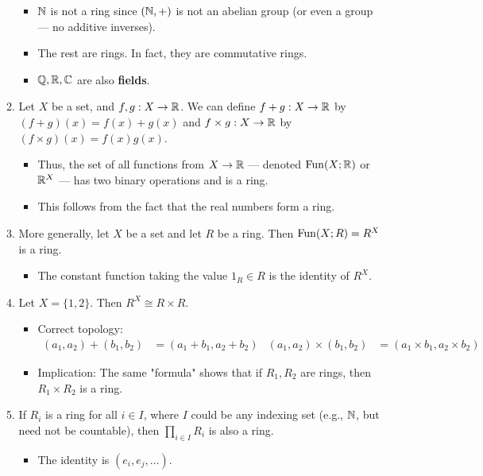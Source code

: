 \documentclass[../notes.tex]{subfiles}
\begin{document}
\begin{itemize}
\begin{enumerate}
\begin{itemize}
            \item $\mathbb{N}$ is not a ring since $(\mathbb{N},+)$ is not an abelian group (or even a group --- no additive inverses).
            \item The rest are rings. In fact, they are commutative rings.
            \item $\mathbb{Q},\mathbb{R},\mathbb{C}$ are also \textbf{fields}.
        \end{itemize}
        \item Let $X$ be a set, and $f,g:X\to\mathbb{R}$. We can define $f+g:X\to\mathbb{R}$ by $(f+g)(x)=f(x)+g(x)$ and $f\times g:X\to\mathbb{R}$ by $(f\times g)(x)=f(x)g(x)$.
        \begin{itemize}
            \item Thus, the set of all functions from $X\to\mathbb{R}$ --- denoted $\operatorname{Fun}(X;\mathbb{R})$ or $\mathbb{R}^X$ --- has two binary operations and is a ring.
            \item This follows from the fact that the real numbers form a ring.
        \end{itemize}
        \item More generally, let $X$ be a set and let $R$ be a ring. Then $\operatorname{Fun}(X;R)=R^X$ is a ring.
        \begin{itemize}
            \item The constant function taking the value $1_R\in R$ is the identity of $R^X$.
        \end{itemize}
        \item Let $X=\{1,2\}$. Then $R^X\cong R\times R$.
        \begin{itemize}
            \item Correct topology:
            \begin{align*}
                (a_1,a_2)+(b_1,b_2) &= (a_1+b_1,a_2+b_2)&
                (a_1,a_2)\times(b_1,b_2) &= (a_1\times b_1,a_2\times b_2)
            \end{align*}
            \item Implication: The same "formula" shows that if $R_1,R_2$ are rings, then $R_1\times R_2$ is a ring.
        \end{itemize}
        \item If $R_i$ is a ring for all $i\in I$, where $I$ could be any indexing set (e.g., $\mathbb{N}$, but need not be countable), then $\prod_{i\in I}R_i$ is also a ring.
        \begin{itemize}
            \item The identity is $(e_i,e_j,\dots)$.
        \end{itemize}

\end{enumerate}
\end{itemize}
\end{document}
